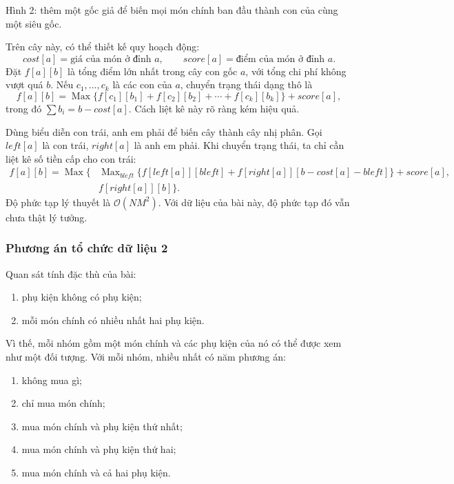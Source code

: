 \documentclass[11pt]{article}
\newcommand{\Oh}{\mathcal{O}}
\newcommand{\Max}{\operatorname{Max}}
\begin{document}
\begin{center}
  \small Hình 2: thêm một gốc giả để biến mọi món chính ban đầu thành con của
  cùng một siêu gốc.
\end{center}

Trên cây này, có thể thiết kế quy hoạch động:
\[
  \mathit{cost}[a] = \text{giá của món ở đỉnh } a,\qquad
  \mathit{score}[a] = \text{điểm của món ở đỉnh } a.
\]
Đặt \(f[a][b]\) là tổng điểm lớn nhất trong cây con gốc \(a\), với tổng chi
phí không vượt quá \(b\). Nếu \(c_1,\ldots,c_k\) là các con của \(a\), chuyển
trạng thái dạng thô là
\[
  f[a][b]=
  \Max\{f[c_1][b_1]+f[c_2][b_2]+\cdots+f[c_k][b_k]\}
  +\mathit{score}[a],
\]
trong đó \(\sum b_i=b-\mathit{cost}[a]\). Cách liệt kê này rõ ràng kém hiệu
quả.

Dùng biểu diễn con trái, anh em phải để biến cây thành cây nhị phân. Gọi
\(\mathit{left}[a]\) là con trái, \(\mathit{right}[a]\) là anh em phải. Khi
chuyển trạng thái, ta chỉ cần liệt kê số tiền cấp cho con trái:
\[
\begin{aligned}
f[a][b]=\Max\{&
  \Max_{\mathit{bleft}}\{
    f[\mathit{left}[a]][\mathit{bleft}]
    +f[\mathit{right}[a]][b-\mathit{cost}[a]-\mathit{bleft}]
  \}+\mathit{score}[a],\\
& f[\mathit{right}[a]][b]\}.
\end{aligned}
\]
Độ phức tạp lý thuyết là \(\Oh(NM^2)\). Với dữ liệu của bài này, độ phức tạp
đó vẫn chưa thật lý tưởng.

\subsubsection*{Phương án tổ chức dữ liệu 2}

Quan sát tính đặc thù của bài:
\begin{enumerate}
  \item phụ kiện không có phụ kiện;
  \item mỗi món chính có nhiều nhất hai phụ kiện.
\end{enumerate}
Vì thế, mỗi nhóm gồm một món chính và các phụ kiện của nó có thể được xem như
một đối tượng. Với mỗi nhóm, nhiều nhất có năm phương án:
\begin{enumerate}
  \item không mua gì;
  \item chỉ mua món chính;
  \item mua món chính và phụ kiện thứ nhất;
  \item mua món chính và phụ kiện thứ hai;
  \item mua món chính và cả hai phụ kiện.
\end{enumerate}
\end{document}
